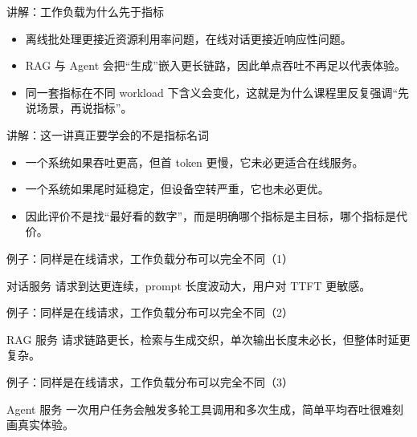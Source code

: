 \begin{frame}{讲解：工作负载为什么先于指标}
  \begin{itemize}
    \item 离线批处理更接近资源利用率问题，在线对话更接近响应性问题。
    \item RAG 与 Agent 会把“生成”嵌入更长链路，因此单点吞吐不再足以代表体验。
    \item 同一套指标在不同 workload 下含义会变化，这就是为什么课程里反复强调“先说场景，再说指标”。
  \end{itemize}
\end{frame}

\begin{frame}{讲解：这一讲真正要学会的不是指标名词}
  \begin{itemize}
    \item 一个系统如果吞吐更高，但首 token 更慢，它未必更适合在线服务。
    \item 一个系统如果尾时延稳定，但设备空转严重，它也未必更优。
    \item 因此评价不是找“最好看的数字”，而是明确哪个指标是主目标，哪个指标是代价。
  \end{itemize}
\end{frame}

\begin{frame}{例子：同样是在线请求，工作负载分布可以完全不同（1）}
\begin{block}{对话服务}
    请求到达更连续，prompt 长度波动大，用户对 TTFT 更敏感。
  \end{block}
\end{frame}

\begin{frame}{例子：同样是在线请求，工作负载分布可以完全不同（2）}
\begin{block}{RAG 服务}
    请求链路更长，检索与生成交织，单次输出长度未必长，但整体时延更复杂。
  \end{block}
\end{frame}

\begin{frame}{例子：同样是在线请求，工作负载分布可以完全不同（3）}
\begin{block}{Agent 服务}
    一次用户任务会触发多轮工具调用和多次生成，简单平均吞吐很难刻画真实体验。
  \end{block}
\end{frame}


